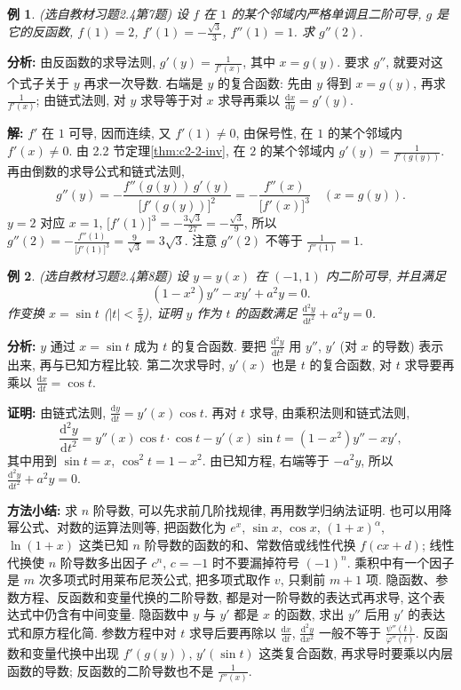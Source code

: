 \documentclass[UTF8,openany]{ctexbook}
\theoremstyle{chinesetextbook}
\newtheorem{example}{例}[section]
\newenvironment{cnproof}{\par\indent\textbf{证明:} \ignorespaces}{\par}
\newenvironment{cnsolution}{\par\indent\textbf{解:} \ignorespaces}{\par}
\newcommand{\dd}{\mathrm d}
\begin{document}
\begin{example}\label{ex:c2-h4-7}
\textnormal{(选自教材习题2.4第7题)} 设 $f$ 在 $1$ 的某个邻域内严格单调且二阶可导, $g$ 是它的反函数, $f(1)=2$, $\displaystyle f'(1)=-\frac{\sqrt3}3$, $f''(1)=1$. 求 $g''(2)$.
\end{example}
\par\indent\textbf{分析:} 由反函数的求导法则, $\displaystyle g'(y)=\frac1{f'(x)}$, 其中 $x=g(y)$. 要求 $g''$, 就要对这个式子关于 $y$ 再求一次导数. 右端是 $y$ 的复合函数: 先由 $y$ 得到 $x=g(y)$, 再求 $\displaystyle\frac1{f'(x)}$; 由链式法则, 对 $y$ 求导等于对 $x$ 求导再乘以 $\displaystyle\frac{\dd x}{\dd y}=g'(y)$.
\begin{cnsolution}
$f'$ 在 $1$ 可导, 因而连续, 又 $f'(1)\ne0$, 由保号性, 在 $1$ 的某个邻域内 $f'(x)\ne0$. 由 2.2 节定理\ref{thm:c2-2-inv}, 在 $2$ 的某个邻域内 $\displaystyle g'(y)=\frac1{f'(g(y))}$. 再由倒数的求导公式和链式法则,
\[
g''(y)=-\frac{f''(g(y))\,g'(y)}{\bigl[f'(g(y))\bigr]^2}=-\frac{f''(x)}{\bigl[f'(x)\bigr]^3}\quad(x=g(y)).
\]
$y=2$ 对应 $x=1$, $\displaystyle\bigl[f'(1)\bigr]^3=-\frac{3\sqrt3}{27}=-\frac{\sqrt3}9$, 所以 $\displaystyle g''(2)=-\frac{f''(1)}{\bigl[f'(1)\bigr]^3}=\frac9{\sqrt3}=3\sqrt3$. 注意 $g''(2)$ 不等于 $\displaystyle\frac1{f''(1)}=1$.
\end{cnsolution}
\begin{example}\label{ex:c2-h4-8}
\textnormal{(选自教材习题2.4第8题)} 设 $y=y(x)$ 在 $(-1,1)$ 内二阶可导, 并且满足
\[
(1-x^2)y''-xy'+a^2y=0.
\]
作变换 $x=\sin t$ ($\displaystyle|t|<\frac\pi2$), 证明 $y$ 作为 $t$ 的函数满足 $\displaystyle\frac{\dd^2y}{\dd t^2}+a^2y=0$.
\end{example}
\par\indent\textbf{分析:} $y$ 通过 $x=\sin t$ 成为 $t$ 的复合函数. 要把 $\displaystyle\frac{\dd^2y}{\dd t^2}$ 用 $y''$, $y'$ (对 $x$ 的导数) 表示出来, 再与已知方程比较. 第二次求导时, $y'(x)$ 也是 $t$ 的复合函数, 对 $t$ 求导要再乘以 $\displaystyle\frac{\dd x}{\dd t}=\cos t$.
\begin{cnproof}
由链式法则, $\displaystyle\frac{\dd y}{\dd t}=y'(x)\cos t$. 再对 $t$ 求导, 由乘积法则和链式法则,
\[
\frac{\dd^2y}{\dd t^2}=y''(x)\cos t\cdot\cos t-y'(x)\sin t=(1-x^2)y''-xy',
\]
其中用到 $\sin t=x$, $\cos^2t=1-x^2$. 由已知方程, 右端等于 $-a^2y$, 所以 $\displaystyle\frac{\dd^2y}{\dd t^2}+a^2y=0$.
\end{cnproof}
\par\indent\textbf{方法小结:} 求 $n$ 阶导数, 可以先求前几阶找规律, 再用数学归纳法证明. 也可以用降幂公式、对数的运算法则等, 把函数化为 $e^x$, $\sin x$, $\cos x$, $(1+x)^\alpha$, $\ln(1+x)$ 这类已知 $n$ 阶导数的函数的和、常数倍或线性代换 $f(cx+d)$; 线性代换使 $n$ 阶导数多出因子 $c^n$, $c=-1$ 时不要漏掉符号 $(-1)^n$. 乘积中有一个因子是 $m$ 次多项式时用莱布尼茨公式, 把多项式取作 $v$, 只剩前 $m+1$ 项. 隐函数、参数方程、反函数和变量代换的二阶导数, 都是对一阶导数的表达式再求导, 这个表达式中仍含有中间变量. 隐函数中 $y$ 与 $y'$ 都是 $x$ 的函数, 求出 $y''$ 后用 $y'$ 的表达式和原方程化简. 参数方程中对 $t$ 求导后要再除以 $\displaystyle\frac{\dd x}{\dd t}$, $\displaystyle\frac{\dd^2y}{\dd x^2}$ 一般不等于 $\displaystyle\frac{\psi''(t)}{\varphi''(t)}$. 反函数和变量代换中出现 $f'(g(y))$, $y'(\sin t)$ 这类复合函数, 再求导时要乘以内层函数的导数; 反函数的二阶导数也不是 $\displaystyle\frac1{f''(x)}$.
\end{document}
